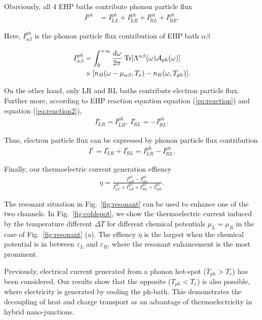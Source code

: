 \documentclass[aps,prb,
,floatfix,footinbib,shortbibliography,
preprint
]{revtex4-1}
\begin{document}
Obuviously, all 4 EHP baths contribute phonon particle flux
\begin{align}
I^{ph} &= I^{ph}_{LL} + I^{ph}_{LR} + I^{ph}_{RL} + I^{ph}_{RR}.
\label{eq:iph}
\end{align}

Here, $I^{ph}_{\alpha\beta}$ is the phonon particle flux contribution of EHP bath $\alpha\beta$

\begin{align}
I^{ph}_{\alpha\beta} &= \int_0^{+\infty}\frac{d\omega}{2\pi}\ {\rm Tr}[\Lambda^{\alpha\beta}(\omega)\mathcal{A}_{ph}(\omega)]\nonumber\\
&\times [n_B(\omega-\mu_{\alpha\beta},{T}_{e})-n_B(\omega,T_{ph})].
\label{eq:iphab}
\end{align}

On the other hand, only LR and RL baths contribute electron particle flux. Further more, according to EHP reaction equation equation (\ref{eq:reaction}) and equation (\ref{eq:reaction2}), 
\begin{align}
I^e_{LR}=I^{ph}_{LR},~I^e_{RL}=-I^{ph}_{RL}. 
\label{eq:ie}
\end{align}


Thus, electron particle flux can be expressed by phonon particle flux contribution
\begin{align}
I^{e} =I^{e}_{LR} + I^{e}_{RL} = I^{ph}_{LR} - I^{ph}_{RL}.
\label{eq:ie}
\end{align}

Finally, our thermoelectric current generation effiency 
\begin{align}
\eta = \frac{I^{ph}_{LR} - I^{ph}_{RL}}{I^{ph}_{LL} + I^{ph}_{LR} + I^{ph}_{RL} + I^{ph}_{RR}}.
\label{eq:tcge}
\end{align}


 The resonant situation in Fig.~\ref{fig:resonant} can be used to enhance one of the two channels. In Fig.~\ref{fig:coldspot}, we show the thermoelectric current induced by the temperature different $\Delta T$ for different chemical potentials $\mu_L=\mu_R$ in the case of Fig.~\ref{fig:resonant} (a). The effiency $\eta$ is the largest when the chemical potential is in between $\varepsilon_L$ and $\varepsilon_R$, where the resonant enhancement is the most prominent.

 Previously, electrical current generated from a phonon hot-spot ($T_{ph}>T_e$) has been considered\cite{entinwuhlman2010three}. Our results show that the opposite ($T_{ph}<T_e$) is also possible, where electricity is generated by cooling the ph-bath. This demonstrates the decoupling of heat and charge transport as an advantage of thermoelectricity in hybrid nano-junctions.
\end{document}
